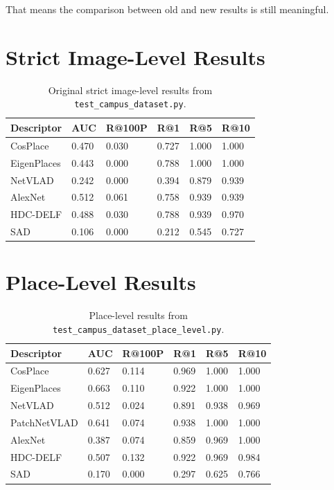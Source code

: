 \documentclass[11pt]{article}
\newcommand{\file}[1]{\texttt{#1}}
\begin{document}
That means the comparison between old and new results is still meaningful.

\section{Strict Image-Level Results}
\begin{table}[H]
\centering
\small
\begin{tabular}{L{2.4cm}C{1.0cm}C{1.1cm}C{0.9cm}C{0.9cm}C{0.9cm}}
\toprule
\textbf{Descriptor} & \textbf{AUC} & \textbf{R@100P} & \textbf{R@1} & \textbf{R@5} & \textbf{R@10} \\
\midrule
CosPlace    & 0.470 & 0.030 & 0.727 & 1.000 & 1.000 \\
EigenPlaces & 0.443 & 0.000 & 0.788 & 1.000 & 1.000 \\
NetVLAD     & 0.242 & 0.000 & 0.394 & 0.879 & 0.939 \\
AlexNet     & 0.512 & 0.061 & 0.758 & 0.939 & 0.939 \\
HDC-DELF    & 0.488 & 0.030 & 0.788 & 0.939 & 0.970 \\
SAD         & 0.106 & 0.000 & 0.212 & 0.545 & 0.727 \\
\bottomrule
\end{tabular}
\caption{Original strict image-level results from \file{test\_campus\_dataset.py}.}
\end{table}

\section{Place-Level Results}
\begin{table}[H]
\centering
\small
\begin{tabular}{L{2.4cm}C{1.0cm}C{1.1cm}C{0.9cm}C{0.9cm}C{0.9cm}}
\toprule
\textbf{Descriptor} & \textbf{AUC} & \textbf{R@100P} & \textbf{R@1} & \textbf{R@5} & \textbf{R@10} \\
\midrule
CosPlace     & 0.627 & 0.114 & 0.969 & 1.000 & 1.000 \\
EigenPlaces  & 0.663 & 0.110 & 0.922 & 1.000 & 1.000 \\
NetVLAD      & 0.512 & 0.024 & 0.891 & 0.938 & 0.969 \\
PatchNetVLAD & 0.641 & 0.074 & 0.938 & 1.000 & 1.000 \\
AlexNet      & 0.387 & 0.074 & 0.859 & 0.969 & 1.000 \\
HDC-DELF     & 0.507 & 0.132 & 0.922 & 0.969 & 0.984 \\
SAD          & 0.170 & 0.000 & 0.297 & 0.625 & 0.766 \\
\bottomrule
\end{tabular}
\caption{Place-level results from \file{test\_campus\_dataset\_place\_level.py}.}
\end{table}
\end{document}
